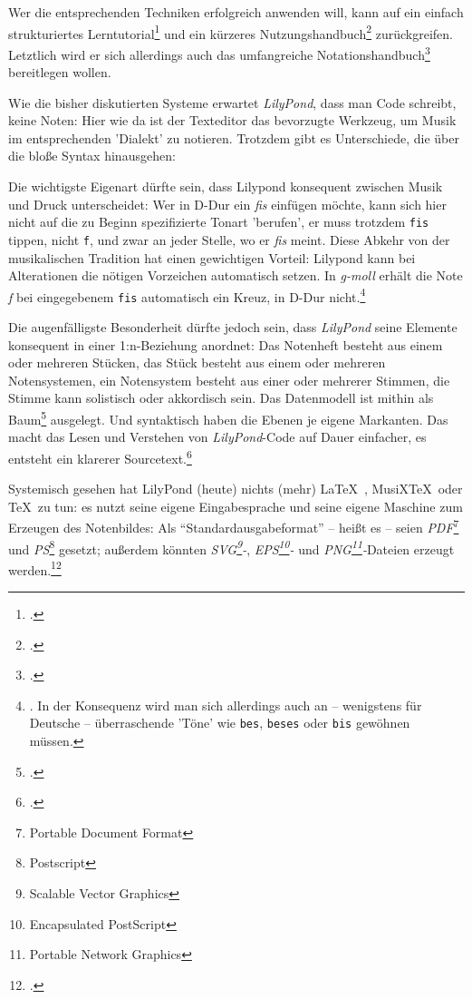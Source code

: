 Wer die entsprechenden Techniken erfolgreich anwenden will, kann auf ein einfach
strukturiertes Lerntutorial\footcite[vgl.][20ff]{LilyPond2018b} und ein kürzeres
Nutzungshandbuch\footcite[vgl.][1ff]{LilyPond2018e} zurückgreifen. Letztlich
wird er sich allerdings auch das umfangreiche
Notationshandbuch\footcite[vgl.][1ff]{LilyPond2018c} bereitlegen wollen.

Wie die bisher diskutierten Systeme erwartet \textit{LilyPond}, dass man Code
schreibt, keine Noten: Hier wie da ist der Texteditor das bevorzugte Werkzeug,
um Musik im entsprechenden 'Dialekt' zu notieren. Trotzdem gibt es Unterschiede,
die über die bloße Syntax hinausgehen:

Die wichtigste Eigenart dürfte sein, dass Lilypond konsequent zwischen Musik und
Druck unterscheidet: Wer in D-Dur ein \textit{fis} einfügen möchte, kann sich
hier nicht auf die zu Beginn spezifizierte Tonart 'berufen', er muss trotzdem
\texttt{fis} tippen, nicht \texttt{f}, und zwar an jeder Stelle, wo er
\textit{fis} meint. Diese Abkehr von der musikalischen Tradition hat einen
gewichtigen Vorteil: Lilypond kann bei Alterationen die nötigen Vorzeichen
automatisch setzen. In \textit{g-moll} erhält die Note \textit{f} bei
eingegebenem \texttt{fis} automatisch ein Kreuz, in D-Dur
nicht.\footnote{\cite[vgl.][21]{LilyPond2018b}. In der Konsequenz wird man sich
allerdings auch an -- wenigstens für Deutsche -- überraschende 'Töne' wie
\texttt{bes}, \texttt{beses} oder \texttt{bis} gewöhnen müssen.}

Die augenfälligste Besonderheit dürfte jedoch sein, dass \textit{LilyPond} seine
Elemente konsequent in einer 1:n-Beziehung anordnet: Das Notenheft besteht aus
einem oder mehreren Stücken, das Stück besteht aus einem oder mehreren
Notensystemen, ein Notensystem besteht aus einer oder mehrerer Stimmen, die
Stimme kann solistisch oder akkordisch sein. Das Datenmodell ist mithin als
Baum\footcite[vgl.][\nopage wp.]{WpedBaum2019a} ausgelegt. Und syntaktisch haben
die Ebenen je eigene Markanten. Das macht das Lesen und Verstehen von
\textit{LilyPond}-Code auf Dauer einfacher, es entsteht ein klarerer
Sourcetext.\footcite[vgl.][40ff]{LilyPond2018b}

Systemisch gesehen hat LilyPond (heute) nichts (mehr) \LaTeX\ , MusiX\TeX\ oder
\TeX\ zu tun: es nutzt seine eigene Eingabesprache und seine eigene Maschine zum
Erzeugen des Notenbildes: Als \enquote{Standardausgabeformat} -- heißt es --
seien \textit{PDF}\footnote{Portable Document Format} und
\textit{PS}\footnote{Postscript} gesetzt; außerdem könnten
\textit{SVG\footnote{Scalable Vector Graphics}-}, \textit{EPS\footnote{Encapsulated
PostScript}-} und \textit{PNG\footnote{Portable Network Graphics}-}Dateien erzeugt
werden.\footcite[vgl.][481]{LilyPond2018c}

